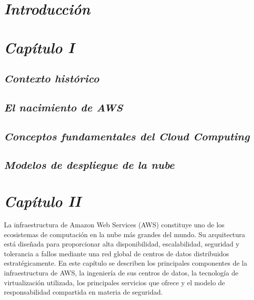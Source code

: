 \documentclass[12pt,a4paper]{article}
\begin{document}
\tableofcontents
\newpage


\section{{\color{azulnoche}\textbf{\textit{Introducción}}}}
\newpage

\section{{\color{azulnoche}\textbf{\textit{Capítulo I}}}}
\subsection{{\color{azulnoche}\textbf{\textit{Contexto histórico}}}}

\subsection{{\color{azulnoche}\textbf{\textit{El nacimiento de AWS}}}}

\subsection{{\color{azulnoche}\textbf{\textit{Conceptos fundamentales del Cloud Computing}}}}

\subsection{{\color{azulnoche}\textbf{\textit{Modelos de despliegue de la nube}}}}
\newpage

\section{{\color{azulnoche}\textbf{\textit{Capítulo II}}}}
La infraestructura de Amazon Web Services (AWS) constituye uno de los ecosistemas de computación en la nube más grandes del mundo. Su arquitectura está diseñada para proporcionar alta disponibilidad, escalabilidad, seguridad y tolerancia a fallos mediante una red global de centros de datos distribuidos estratégicamente. En este capítulo se describen los principales componentes de la infraestructura de AWS, la ingeniería de sus centros de datos, la tecnología de virtualización utilizada, los principales servicios que ofrece y el modelo de responsabilidad compartida en materia de seguridad.
\end{document}
